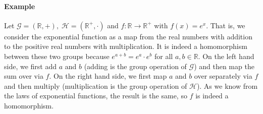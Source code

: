 \paragraph{Example}
Let  $\mathcal{G} = (\mathbb{R}, +), \; \mathcal{H} = (\mathbb{R}^+, \cdot)$ and $f: \mathbb{R} \rightarrow \mathbb{R}^+$ with $f(x) = e^x$. That is, we consider the exponential function as a map from the real numbers with addition to the positive real  numbers with multiplication. It is indeed a homomorphism between these two groups because $e^{a+b} = e^a \cdot e^b$ for all $a,b \in \mathbb{R}$. On the left hand side, we first add $a$ and $b$ (adding is the group operation of $\mathcal{G}$) and then map the sum over via $f$. On the right hand side, we first map $a$ and $b$ over separately via $f$ and then multiply (multiplication is the group operation of $\mathcal{H}$). As we know from the laws of exponential functions, the result is the same, so $f$ is indeed a homomorphism.












